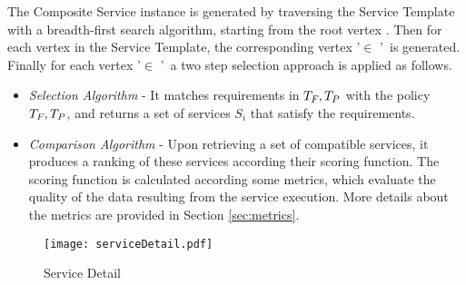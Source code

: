     The Composite Service  instance  is generated by traversing the Service Template with a breadth-first search algorithm,
    starting from the root vertex . Then for each vertex  in the Service Template, the corresponding vertex '$\in$ \V'\ is generated.
    Finally for each vertex  '$\in$ \V'\ a two step selection approach is applied as follows.
\begin{itemize}
  \item \textit{Selection Algorithm} - It matches requirements in $T_{F_{}},T_P$ with the policy $T_{F_{}},T_P$, and returns a set of services $S_i$ that satisfy the requirements.
  \item \textit{Comparison Algorithm} - Upon retrieving a set of compatible services, it produces a ranking of these services according their scoring function.
        The scoring function is calculated according some metrics, which evaluate the quality of the data resulting from the service execution.
        More details about the metrics are provided in Section \ref{sec:metrics}.
\end{itemize}









\begin{figure}
  \centering
  \texttt{[image: serviceDetail.pdf]}
  \caption{Service Detail}
  \label{fig:service_detail}
\end{figure}